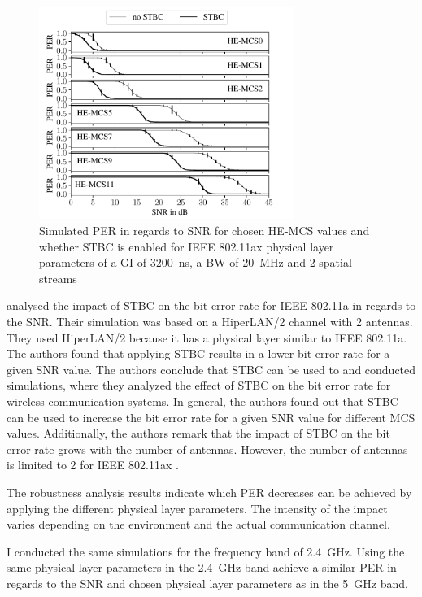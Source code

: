 \begin{figure}%
   \centering
   \includegraphics[width=0.74\textwidth]{figures/STBC_PER_to_SNR.pdf}
   \caption{Simulated \ac{PER} in regards to \ac{SNR} for chosen HE-\ac{MCS} values and whether \ac{STBC} is enabled for IEEE 802.11ax physical layer parameters of a \ac{GI} of \SI{3200}{\nano\second}, a \ac{BW} of \SI{20}{\mega\hertz} and 2 spatial streams}%
   \label{fig:PER_SNR_STBC}%
\end{figure}
\textcite{stamoulis_impact_2003} analysed the impact of \ac{STBC} on the bit error rate for IEEE 802.11a in regards to the \ac{SNR}. Their simulation was based
on a HiperLAN/2 channel with \num{2} antennas. They used HiperLAN/2 because it has a physical layer similar to IEEE 802.11a.
The authors found that applying \ac{STBC} results in a lower bit error rate for a given \ac{SNR} value. The authors conclude that \ac{STBC} can be used to
\textcite{santumon_space-time_2012} and \textcite{tarokh_space-time_1999} conducted simulations, where they analyzed the effect of \ac{STBC} on the bit error rate for
wireless communication systems. In general, the authors found out that \ac{STBC} can be used to increase the bit error rate for a given \ac{SNR} value for different
\ac{MCS} values. Additionally, the authors remark that the impact of \ac{STBC} on the bit error rate grows with the number of antennas.
However, the number of antennas is limited to \num{2} for IEEE 802.11ax \cite{noauthor_ieee_2021}.

The robustness analysis results indicate which \ac{PER} decreases can be achieved by applying the different physical layer parameters.
The intensity of the impact varies depending on the environment and the actual communication channel.

I conducted the same simulations for the frequency band of \SI{2.4}{\giga\hertz}. Using the same physical layer parameters in
the \SI{2.4}{\giga\hertz} band achieve a similar \ac{PER} in regards to the \ac{SNR} and chosen physical layer parameters
as in the \SI{5}{\giga\hertz} band.

